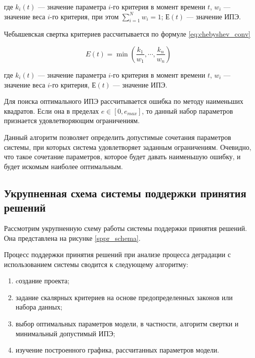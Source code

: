 \noindent
где $k_i(t)$ --- значение параметра $i$-го критерия в момент времени $t$,
$w_i$ --- значение веса $i$-го критерия, при этом $\sum^N_{i=1} w_i = 1$; 
$Е(t)$ --- значение ИПЭ.

Чебышевская свертка критериев рассчитывается по формуле \ref{eq:chebyshev_conv}

\begin{equation}
    \label{eq:chebyshev_conv}
    E(t) = \min(\frac{k_1}{w_1}, \cdots, \frac{k_n}{w_n})
\end{equation}
\vspace{1em}

\noindent
где $k_i(t)$ --- значение параметра $i$-го критерия в момент времени $t$,
$w_i$ --- значение веса $i$-го критерия,
$Е(t)$ --- значение ИПЭ.

Для поиска оптимального ИПЭ рассчитывается ошибка по методу наименьших квадратов. 
Если она в пределах $e \in [0,e_{max}]$, то данный набор параметров признается удовлетворяющим ограничениям.

Данный алгоритм позволяет определить допустимые сочетания параметров системы, при которых система удовлетворяет заданным ограничениям. 
Очевидно, что такое сочетание параметров, которое будет давать наименьшую ошибку, и будет искомым наиболее оптимальным.

\subsection{Укрупненная схема системы поддержки принятия решений}
Рассмотрим укрупненную схему работы системы поддержки принятия решений.
Она представлена на рисунке \ref{sppr_schema}.


Процесс поддержки принятия решений при анализе процесса деградации с использованием системы сводится к следующему алгоритму:
\begin{enumerate}
  \item cоздание проекта;
  \item задание скалярных критериев на основе предопределенных законов или набора данных;
  \item выбор оптимальных параметров модели, в частности, алгоритм свертки и минимальный допустимый ИПЭ;
  \item изучение построенного графика, рассчитанных параметров модели.
\end{enumerate}

